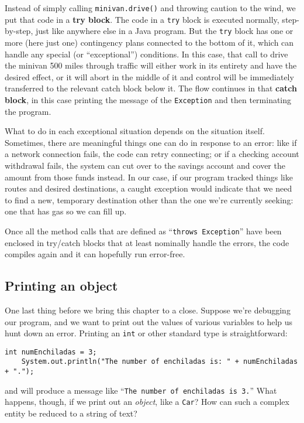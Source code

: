 Instead of simply calling \texttt{minivan.drive()} and throwing caution to the
wind, we put that code in a \textbf{try block}. The code in a \texttt{try}
block is executed normally, step-by-step, just like anywhere else in a Java
program. But the \texttt{try} block has one or more (here just one)
contingency plans connected to the bottom of it, which can handle any special
(or ``exceptional'') conditions. In this case, that call to drive the minivan
500 miles through traffic will either work in its entirety and have the
desired effect, or it will abort in the middle of it and control will be
immediately transferred to the relevant catch block below it. The flow
continues in that \textbf{catch block}, in this case printing the message of
the \texttt{Exception} and then terminating the program.

What to do in each exceptional situation depends on the situation itself.
Sometimes, there are meaningful things one can do in response to an error:
like if a network connection fails, the code can retry connecting; or if a
checking account withdrawal fails, the system can cut over to the savings
account and cover the amount from those funds instead. In our case, if our
program tracked things like routes and desired destinations, a caught
exception would indicate that we need to find a new, temporary destination
other than the one we're currently seeking: one that has gas so we can fill
up.

Once all the method calls that are defined as ``\texttt{throws Exception}''
have been enclosed in try/catch blocks that at least nominally handle the
errors, the code compiles again and it can hopefully run error-free.

\subsection{Printing an object}

One last thing before we bring this chapter to a close. Suppose we're
debugging our program, and we want to print out the values of various
variables to help us hunt down an error. Printing an \texttt{int} or other
standard type is straightforward:

\begin{Verbatim}[samepage=true,fontsize=\scriptsize,frame=single]
    int numEnchiladas = 3;
    System.out.println("The number of enchiladas is: " + numEnchiladas + ".");
\end{Verbatim}

and will produce a message like ``\texttt{The number of enchiladas is 3.}''
What happens, though, if we print out an \textit{object}, like a \texttt{Car}?
How can such a complex entity be reduced to a string of text?

